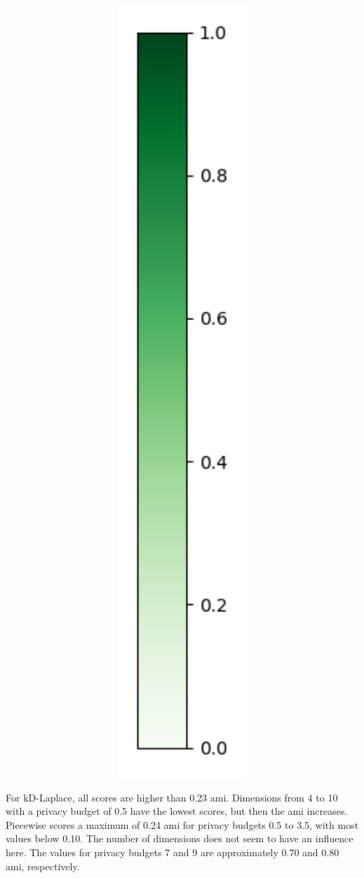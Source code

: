 \begin{figure}[H]
\begin{subfigure}[b]{0.075\textwidth}
    \includegraphics[width=1\textwidth]{Results/kd-laplace/kd-Laplace/seeds-dataset/heatmap_legend.png}
  \end{subfigure}
\end{figure}
For kD-Laplace, all scores are higher than 0.23 \gls{ami}.
Dimensions from 4 to 10 with a privacy budget of 0.5 have the lowest scores, but then the \gls{ami} increases.
Piecewise scores a maximum of 0.24 \gls{ami} for privacy budgets 0.5 to 3.5, with most values below 0.10. The number of dimensions does not seem to have an influence here.
The values for privacy budgets 7 and 9 are approximately 0.70 and 0.80 \gls{ami}, respectively.
\newpage
